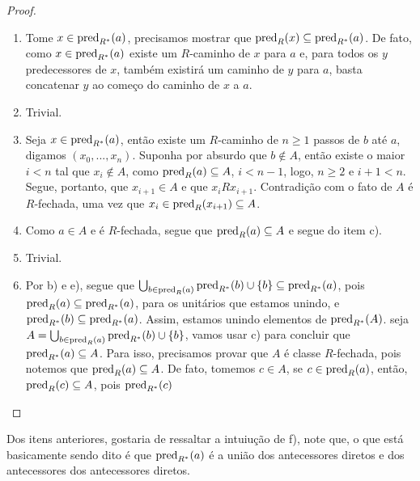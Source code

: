 \begin{proof}
    \begin{enumerate}[label=\alph*)]
        \item Tome $x\in \operatorname{pred}_{R^*}(a)$, precisamos mostrar que $\operatorname{pred}_R(x) \subseteq \operatorname{pred}_{R^*}(a)$. De fato, como $x\in \operatorname{pred}_{R^*}(a)$ existe um $R$-caminho de $x$ para $a$ e, para todos os $y$ predecessores de $x$, também existirá um caminho de $y$ para $a$, basta concatenar $y$ ao começo do caminho de $x$ a $a$.
        \item Trivial. 
        \item Seja $x\in \operatorname{pred}_{R^*}(a)$, então existe um $R$-caminho de $n \geq 1$ passos de $b$ até $a$, digamos $(x_0,...,x_n)$. Suponha por absurdo que $b\notin A$, então existe o maior $i < n$ tal que $x_i \notin A$, como $\operatorname{pred}_R(a) \subseteq A$, $i < n - 1$, logo, $n \geq 2$ e $i + 1 < n$. Segue, portanto, que $x_{i + 1} \in A$ e que $x_i R x_{i + 1}$. Contradição com o fato de $A$ é $R$-fechada, uma vez que $x_i \in \operatorname{pred}_R(x_{i + 1}) \subseteq A$.
        \item Como $a\in A$ e é $R$-fechada, segue que $\operatorname{pred}_R(a) \subseteq A$ e segue do item c). 
        \item Trivial. 
        \item Por b) e e), segue que $\bigcup_{b\in \operatorname{pred}_R(a)} \operatorname{pred}_{R^*}(b)\cup\left\{ b \right\} \subseteq \operatorname{pred}_{R^*}(a)$, pois $\operatorname{pred}_R(a) \subseteq \operatorname{pred}_{R^*}(a)$, para os unitários que estamos unindo, e $\operatorname{pred}_{R^*}(b) \subseteq \operatorname{pred}_{R^*}(a)$. Assim, estamos unindo elementos de $\operatorname{pred}_{R^*}(A)$. seja $A = \bigcup_{b\in \operatorname{pred}_R(a)} \operatorname{pred}_{R^*}(b)\cup\left\{ b \right\}$, vamos usar c) para concluir que $\operatorname{pred}_{R^*}(a) \subseteq A$. Para isso, precisamos provar que $A$ é classe $R$-fechada, pois notemos que $\operatorname{pred}_R(a) \subseteq A$. De fato, tomemos $c\in A$, se $c\in \operatorname{pred}_R(a)$, então, $\operatorname{pred}_R(c) \subseteq A$, pois $\operatorname{pred}_{R^*}(c) $  \pending
    \end{enumerate}
\end{proof}

\begin{remark}
    Dos itens anteriores, gostaria de ressaltar a intuiução de f), note que, o que está basicamente sendo dito é que $\operatorname{pred}_{R^*}(a)$ é a união dos antecessores diretos e dos antecessores dos antecessores diretos. 
\end{remark}